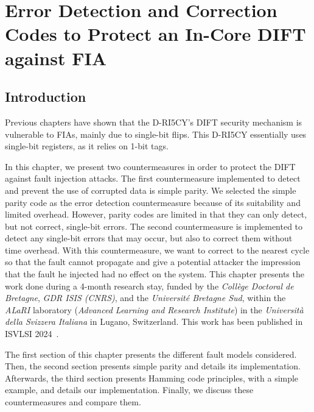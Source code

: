 \chapter{Error Detection and Correction Codes to Protect an In-Core DIFT against FIA}
\label{chapter:countermeasures}
\minitoc

\section{Introduction}
Previous chapters have shown that the D-RI5CY's DIFT security mechanism is vulnerable to FIAs, mainly due to single-bit flips. This D-RI5CY essentially uses single-bit registers, as it relies on 1-bit tags.

In this chapter, we present two countermeasures in order to protect the DIFT against fault injection attacks.
The first countermeasure implemented to detect and prevent the use of corrupted data is simple parity. We selected the simple parity code as the error detection countermeasure because of its suitability and limited overhead. However, parity codes are limited in that they can only detect, but not correct, single-bit errors.
The second countermeasure is implemented to detect any single-bit errors that may occur, but also to correct them without time overhead. With this countermeasure, we want to correct to the nearest cycle so that the fault cannot propagate and give a potential attacker the impression that the fault he injected had no effect on the system.
This chapter presents the work done during a 4-month research stay, funded by the \textit{Collège Doctoral de Bretagne}, \textit{GDR ISIS (CNRS)}, and the \textit{Université Bretagne Sud}, within the \textit{ALaRI} laboratory (\textit{Advanced Learning and Research Institute}) in the \textit{Università della Svizzera Italiana} in Lugano, Switzerland.
This work has been published in ISVLSI 2024~\cite{PRLG-24-isvlsi}.

The first section of this chapter presents the different fault models considered. Then, the second section presents simple parity and details its implementation. Afterwards, the third section presents Hamming code principles, with a simple example, and details our implementation. Finally, we discuss these countermeasures and compare them.

